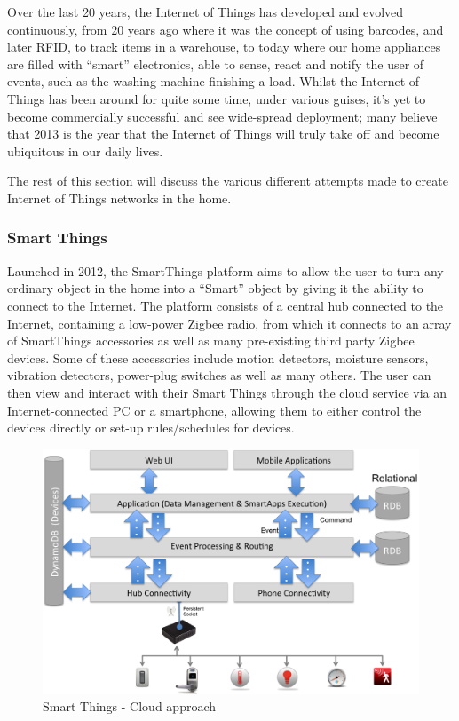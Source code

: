 Over the last 20 years, the Internet of Things has developed and evolved continuously, from 20 years ago where it was the concept of using barcodes, and later RFID\cite{K.Ashton}, to track items in a warehouse, to today where our home appliances are filled with ``smart'' electronics, able to sense, react and notify the user of events, such as the washing machine finishing a load. Whilst the Internet of Things has been around for quite some time, under various guises, it's yet to become commercially successful and see wide-spread deployment; many believe that 2013 is the year that the Internet of Things will truly take off and become ubiquitous in our daily lives\cite{2013IoT}.

The rest of this section will discuss the various different attempts made to create Internet of Things networks in the home.

\subsubsection{Smart Things} %
\label{ssub:smart_things}
Launched in 2012, the SmartThings platform aims to allow the user to turn any ordinary object in the home into a ``Smart'' object by giving it the ability to connect to the Internet. The platform consists of a central hub connected to the Internet, containing a low-power Zigbee radio, from which it connects to an array of SmartThings accessories as well as many pre-existing third party Zigbee devices. Some of these accessories include motion detectors, moisture sensors, vibration detectors, power-plug switches as well as many others. The user can then view and interact with their Smart Things through the cloud service via an Internet-connected PC or a smartphone, allowing them to either control the devices directly or set-up rules/schedules for devices.

\begin{figure}[h!]
\centering
    \includegraphics[scale=0.4]{images/smartThingsCloudFirstDiagram.png}
    \caption[]{Smart Things - Cloud approach\footnotemark}
    \label{fig:cloud}
\end{figure}

